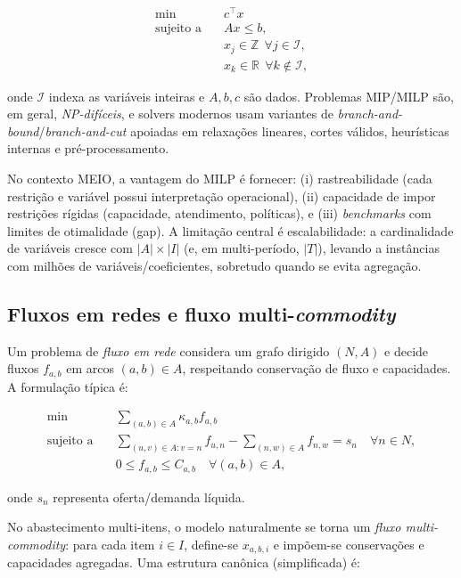 \begin{align}
\min \quad & c^\top x \\
\text{sujeito a} \quad & A x \le b, \\
& x_j \in \mathbb{Z} \ \ \forall j \in \mathcal{I}, \\
& x_k \in \mathbb{R} \ \ \forall k \notin \mathcal{I},
\end{align}

onde \(\mathcal{I}\) indexa as variáveis inteiras e \(A,b,c\) são dados. \cite{Shapiro2001ModelingSupplyChain} Problemas MIP/MILP são, em geral, \emph{NP-difíceis}, e solvers modernos usam variantes de \emph{branch-and-bound}/\emph{branch-and-cut} apoiadas em relaxações lineares, cortes válidos, heurísticas internas e pré-processamento. \cite{GurobiMIPPrimer}

No contexto MEIO, a vantagem do MILP é fornecer: (i) rastreabilidade (cada restrição e variável possui interpretação operacional), (ii) capacidade de impor restrições rígidas (capacidade, atendimento, políticas), e (iii) \emph{benchmarks} com limites de otimalidade (gap). A limitação central é escalabilidade: a cardinalidade de variáveis cresce com \(|A|\times |I|\) (e, em multi-período, \(|T|\)), levando a instâncias com milhões de variáveis/coeficientes, sobretudo quando se evita agregação. \cite{AhujaMagnantiOrlin1993NetworkFlows,Shapiro2001ModelingSupplyChain,Geevers2024MEIODRL}

\subsection{Fluxos em redes e fluxo multi-\emph{commodity}}

Um problema de \emph{fluxo em rede} considera um grafo dirigido \((N,A)\) e decide fluxos \(f_{a,b}\) em arcos \((a,b)\in A\), respeitando conservação de fluxo e capacidades. A formulação típica é:

\begin{align}
\min \quad & \sum_{(a,b)\in A} \kappa_{a,b} f_{a,b} \\
\text{sujeito a} \quad
& \sum_{(u,v)\in A: v=n} f_{u,n} - \sum_{(n,w)\in A} f_{n,w} = s_n \quad \forall n\in N, \\
& 0 \le f_{a,b} \le C_{a,b} \quad \forall (a,b)\in A,
\end{align}

onde \(s_n\) representa oferta/demanda líquida. \cite{AhujaMagnantiOrlin1993NetworkFlows}

No abastecimento multi-itens, o modelo naturalmente se torna um \emph{fluxo multi-\emph{commodity}}: para cada item \(i\in I\), define-se \(x_{a,b,i}\) e impõem-se conservações e capacidades agregadas. Uma estrutura canônica (simplificada) é:

